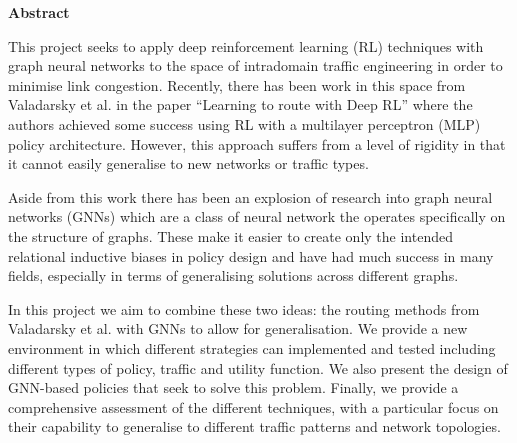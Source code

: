\newpage
{\Huge \bf Abstract}
\vspace{24pt} 

This project seeks to apply deep reinforcement learning (RL) techniques with graph neural networks to the space of intradomain traffic engineering in order to minimise link congestion. Recently, there has been work in this space from Valadarsky et al. in the paper ``Learning to route with Deep RL'' where the authors achieved some success using RL with a multilayer perceptron (MLP) policy architecture. However, this approach suffers from a level of rigidity in that it cannot easily generalise to new networks or traffic types.

Aside from this work there has been an explosion of research into graph neural networks (GNNs) which are a class of neural network the operates specifically on the structure of graphs. These make it easier to create only the intended relational inductive biases in policy design and have had much success in many fields, especially in terms of generalising solutions across different graphs.

In this project we aim to combine these two ideas: the routing methods from Valadarsky et al. with GNNs to allow for generalisation. We provide a new environment in which different strategies can implemented and tested including different types of policy, traffic and utility function. We also present the design of GNN-based policies that seek to solve this problem. Finally, we provide a comprehensive assessment of the different techniques, with a particular focus on their capability to generalise to different traffic patterns and network topologies.

\newpage
\vspace*{\fill}
